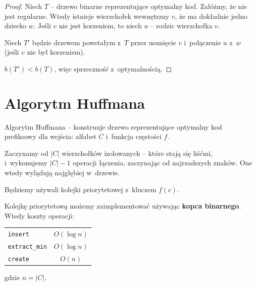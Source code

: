\documentclass[a4paper,11pt]{article}
\theoremstyle{definition}
\begin{document}
\begin{proof}
Niech $T$ -- drzewo binarne reprezentujące optymalny kod. Załóżmy, że nie jest regularne. Wtedy istnieje wierzchołek wewnętrzny $v$, że ma dokładnie jedno dziecko $w$. Jeśli $v$ nie jest korzeniem, to niech $u$ -- rodzic wierzchołka $v$.

\begin{center}
\hspace{3cm}
\end{center}

Niech $T'$ będzie drzewem powstałym z~$T$ przez usunięcie $v$ i~połączenie $u$ z~$w$ (jeśli $v$ nie był korzeniem).

$b(T') < b(T)$, więc sprzeczność z~optymalnością.
\end{proof}

\section{Algorytm Huffmana}

Algorytm Huffmana -- konstruuje drzewo reprezentujące optymalny kod prefiksowy dla wejścia: alfabet $C$ i~funkcja częstości $f$.

Zaczynamy od $|C|$ wierzchołków izolowanych -- które stają się liśćmi, i~wykonujemy $|C| - 1$ operacji łączenia, zaczynając od najrzadszych znaków. One wtedy wylądują najgłębiej w~drzewie.

Będziemy używali kolejki priorytetowej z~kluczem $f(c)$.

Kolejkę priorytetową możemy zaimplementować używając \textbf{kopca binarnego}. Wtedy koszty operacji:

\begin{center}
\begin{tabular}{lc}
    \texttt{insert} & $O(\log n)$ \\
    \texttt{extract\_min} & $O(\log n)$ \\
    \texttt{create} & $O(n)$
\end{tabular}
\end{center}
gdzie $n = |C|$.
\end{document}
